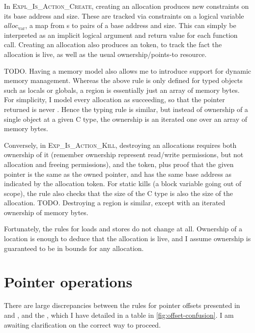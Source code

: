 In \textsc{Expl\_Is\_Action\_Create}, creating an allocation produces new
constraints on its base address and size. These are tracked via constraints on a
logical variable $\mathit{alloc}_\mathrm{var}$, a map from s to
pairs of a base address and size. This can simply be interpreted as an implicit
logical argument and return value for each function call. Creating an
allocation also produces an  token, to track the fact the
allocation is live, as well as the usual ownership/points-to resource.

TODO\@. Having a memory model also allows me to introduce support for dynamic
memory management. Whereas the above rule is only defined for typed objects
such as locals or globals, a region is essentially just an array of memory
bytes. For simplicity, I model every allocation as succeeding, so that the
pointer returned is never . Hence the typing rule is similar,
but instead of ownership of a single object at a given C type, the ownership
is an iterated one over an array of memory bytes.

Conversely, in \textsc{Exp\_Is\_Action\_Kill}, destroying an allocations
requires both ownership of it (remember ownership represent read/write
permissions, but not allocation and freeing permissions), and the
 token, plus proof that the given pointer is the same as the
owned pointer, and has the same base address as indicated by the allocation
token. For static kills (a block variable going out of scope), the rule also
checks that the size of the C type is also the size of the allocation.
TODO\@. Destroying a region is similar, except with an iterated ownership
of memory bytes.

Fortunately, the rules for loads and stores do not change at all. Ownership of
a location is enough to deduce that the allocation is live, and I assume
ownership is guaranteed to be in bounds for any allocation.

\section{Pointer operations}

There are large discrepancies between the rules for pointer offsets presented
in  and , and
the , which I have detailed in a table in
\cref{fig:offset-confusion}. I am awaiting clarification on the correct way to
proceed.

